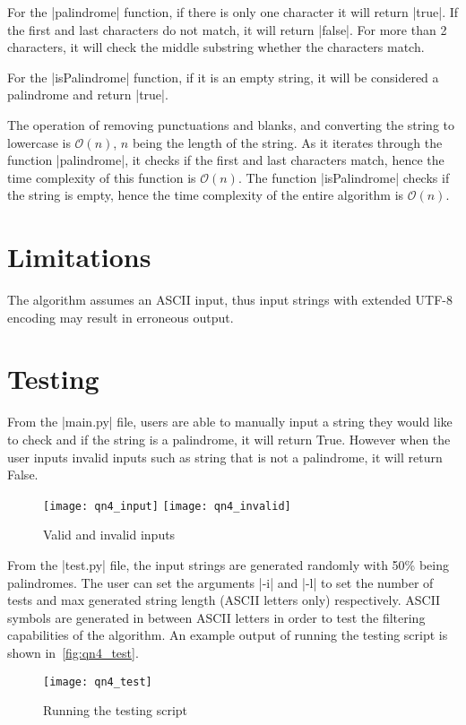 \documentclass{report}
\begin{document}
For the |palindrome| function, if there is only one character it will return |true|. If the first and last characters do not match, it will return |false|. For more than 2 characters, it will check the middle substring whether the characters match.

For the |isPalindrome| function, if it is an empty string, it will be considered a palindrome and return |true|.

The operation of removing punctuations and blanks, and converting the string to lowercase is \(\mathcal{O}(n)\), \(n\) being the length of the string. As it iterates through the function |palindrome|, it checks if the first and last characters match, hence the time complexity of this function is \(\mathcal{O}(n)\). The function |isPalindrome| checks if the string is empty, hence the time complexity of the entire algorithm is \(\mathcal{O}(n)\).

\section{Limitations}
The algorithm assumes an ASCII input, thus input strings with extended UTF-8 encoding may result in erroneous output.
\section{Testing}
From the |main.py| file, users are able to manually input a string they would like to check and if the string is a palindrome, it will return True. However when the user inputs invalid inputs such as string that is not a palindrome, it will return False.
\begin{figure}[H]
	\centering
	\caption{Valid and invalid inputs}
	\texttt{[image: qn4\_input]}
	\texttt{[image: qn4\_invalid]}
	\label{fig:qn4_input}
\end{figure}
From the |test.py| file, the input strings are generated randomly with 50\% being palindromes. The user can set the arguments |-i| and |-l| to set the number of tests and max generated string length (ASCII letters only) respectively. ASCII symbols are generated in between ASCII letters in order to test the filtering capabilities of the algorithm. An example output of running the testing script is shown in~\autoref{fig:qn4_test}.
\begin{figure}[H]
	\centering
	\caption{Running the testing script}
	\texttt{[image: qn4\_test]}
	\label{fig:qn4_test}
\end{figure}
\end{document}
